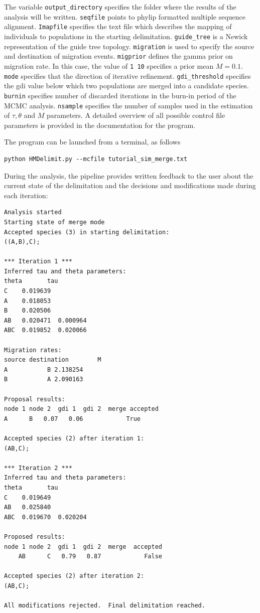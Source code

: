 \documentclass[A4]{article1}
\begin{document}
The variable \texttt{output\_directory} specifies the folder where the results of the
analysis will be written. \texttt{seqfile} points to phylip formatted multiple sequence
alignment. \texttt{Imapfile} specifies the text file which describes the mapping of
individuals to populations in the starting delimitation. \texttt{guide\_tree} is a Newick
representation of the guide tree topology.  \texttt{migration} is used to specify the source
and destination of migration events.  \texttt{migprior} defines the gamma prior on migration
rate.  In this case, the value of \texttt{1 10} specifies a prior mean $M = 0.1$.
\texttt{mode} specifies that the direction of iterative refinement. \texttt{gdi\_threshold}
specifies the gdi value below which two populations are merged into a candidate species.
\texttt{burnin} specifies number of discarded iterations in the burn-in period of the MCMC
analysis. \texttt{nsample} specifies the number of samples used in the estimation of $\tau,
\theta$ and $M$ parameters. A detailed overview of all possible control file parameters is
provided in the documentation for the program.


The program can be launched from a terminal, as follows

\begin{small}
\begin{verbatim}
python HMDelimit.py --mcfile tutorial_sim_merge.txt
\end{verbatim}
\end{small}

During the analysis, the pipeline provides written feedback to the user about the current
state of the delimitation and the decisions and modifications made during each iteration:

\begin{small}
\begin{verbatim}
Analysis started
Starting state of merge mode
Accepted species (3) in starting delimitation:
((A,B),C);

*** Iteration 1 ***
Inferred tau and theta parameters:                       
theta       tau
C    0.019639       
A    0.018053       
B    0.020506       
AB   0.020471  0.000964
ABC  0.019852  0.020066

Migration rates:
source destination        M
A           B 2.138254
B           A 2.090163

Proposal results:
node 1 node 2  gdi 1  gdi 2  merge accepted
A      B   0.07   0.06            True

Accepted species (2) after iteration 1:	
(AB,C);

*** Iteration 2 ***
Inferred tau and theta parameters:                       
theta       tau
C    0.019649       
AB   0.025840       
ABC  0.019670  0.020204

Proposed results:
node 1 node 2  gdi 1  gdi 2  merge  accepted
    AB      C   0.79   0.87            False

Accepted species (2) after iteration 2:
(AB,C);

All modifications rejected.  Final delimitation reached.
\end{verbatim}
\end{small}
\end{document}
